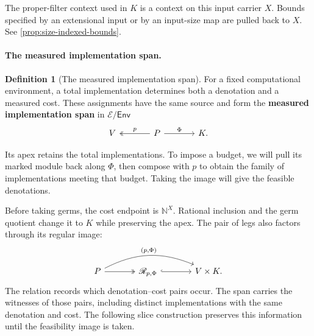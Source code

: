 \documentclass[11pt,a4paper]{article}
\numberwithin{algorithm}{section}
\numberwithin{equation}{section}
\theoremstyle{definition}
\newtheorem{definition}[definition]{Definition}
\theoremstyle{remark}
\theoremstyle{plain}
\newcommand{\E}{\mathcal E}
\newcommand{\Env}{\mathsf{Env}}
\newcommand{\N}{\mathbb N}
\theoremstyle{definition}
\theoremstyle{plain}
\begin{document}
The proper-filter context used in $K$ is a context on this input
carrier $X$. Bounds specified by an extensional input or by an input-size
map are pulled back to $X$. See \cref{prop:size-indexed-bounds}.


\paragraph{The measured implementation span.}


\begin{definition}[The measured implementation span]\label{def:measured-span}
For a fixed computational environment, a total implementation
determines both a denotation and a measured cost. These assignments
have the same source and form the \textbf{measured implementation span}
in $\E/\Env$
\begin{equation}\label{eq:cat-measured-span}
\begin{tikzcd}[column sep=large]
 V & P \arrow[l,two heads,"{p}"'] \arrow[r,"{\Phi}"] & K .
\end{tikzcd}
\end{equation}
\end{definition}


Its apex retains the total implementations. To impose a budget,
we will pull its marked module back along $\Phi$, then compose with
$p$ to obtain the family of implementations meeting that budget.
Taking the image will give the feasible denotations.

Before taking germs, the cost endpoint is $\N^X$.
Rational inclusion and the germ quotient change it to $K$ while
preserving the apex. The pair of legs also factors through its
regular image:
\[
\begin{tikzcd}[column sep=large]
 P \arrow[r,two heads] \arrow[rr,bend left=25,"{{(p,\Phi)}}"]
   & \mathscr R_{p,\Phi} \arrow[r,hook] & V\times K .
\end{tikzcd}
\]
The relation records which denotation--cost pairs occur.
The span carries the witnesses of those pairs, including distinct
implementations with the same denotation and cost. The following
slice construction preserves this information until the feasibility
image is taken.
\end{document}

